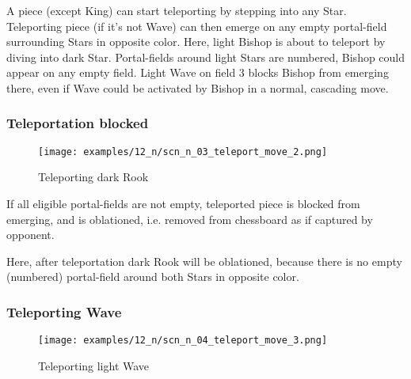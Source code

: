 \vspace*{-0.5\baselineskip}
A piece (except King) can start teleporting by stepping into any Star.
Teleporting piece (if it's not Wave) can then emerge on any empty portal-field
surrounding Stars in opposite color.
Here, light Bishop is about to teleport by diving into dark Star. Portal-fields
around light Stars are numbered, Bishop could appear on any empty field. Light
Wave on field 3 blocks Bishop from emerging there, even if Wave could be activated
by Bishop in a normal, cascading move.

\clearpage %

\subsubsection*{Teleportation blocked}
\label{sec:Nineteen/Star/Teleporting pieces/Teleportation blocked}

\vspace*{-1.0\baselineskip}
\noindent
\begin{figure}[!h]
\texttt{[image: examples/12\_n/scn\_n\_03\_teleport\_move\_2.png]}
\caption{Teleporting dark Rook}
\label{fig:scn_n_03_teleport_move_2}
\end{figure}

If all eligible portal-fields are not empty, teleported piece is blocked from
emerging, and is oblationed, i.e. removed from chessboard as if captured by
opponent.

Here, after teleportation dark Rook will be oblationed, because there is no empty
(numbered) portal-field around both Stars in opposite color.

\clearpage %

\subsubsection*{Teleporting Wave}
\label{sec:Nineteen/Star/Teleporting pieces/Teleporting Wave}

\vspace*{-1.0\baselineskip}
\noindent
\begin{figure}[!h]
\texttt{[image: examples/12\_n/scn\_n\_04\_teleport\_move\_3.png]}
\caption{Teleporting light Wave}
\label{fig:scn_n_04_teleport_move_3}
\end{figure}


